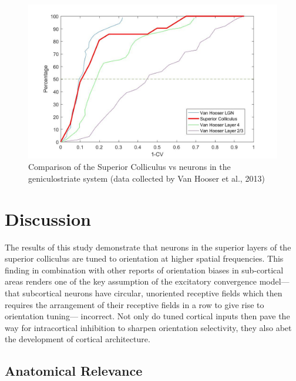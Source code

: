 	\begin{figure}
		\includegraphics[width=\linewidth]{SCvgeniculostriate.jpg}
		\caption{ Comparison of the Superior Colliculus vs neurons in the geniculostriate system (data collected by Van Hooser et al., 2013)}
		\label{fig:fig7}			
	\end{figure}
	
	
	\section{Discussion}
		The results of this study demonstrate that neurons in the superior layers of the superior colliculus are tuned to orientation at higher spatial frequencies. This finding in combination with other reports of orientation biases in sub-cortical areas renders one of the key assumption of the excitatory convergence model— that subcortical neurons have circular, unoriented receptive fields which then requires the arrangement of their receptive fields in a row to give rise to orientation tuning— incorrect. Not only do tuned cortical inputs then pave the way for intracortical inhibition to sharpen orientation selectivity, they also abet the development of cortical architecture.
		
		\subsection{Anatomical Relevance}
		
